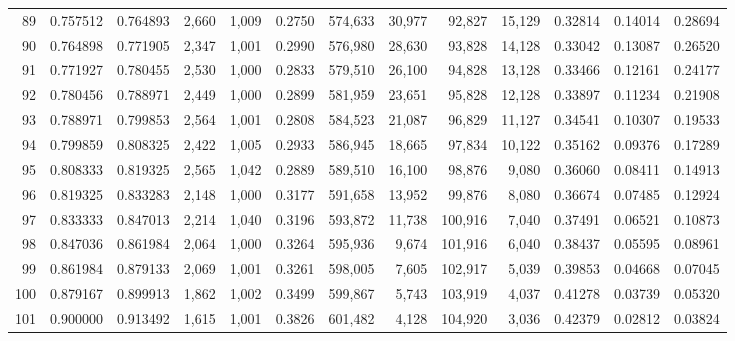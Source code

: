 \begin{tabular}{rrrrrrrrrrrrr}
89  &  0.757512 &  0.764893 &   2,660 &  1,009 &                                     0.2750 &  574,633 &   30,977 &   92,827 &   15,129 &  0.32814 &  0.14014 &  0.28694 \\
90  &  0.764898 &  0.771905 &   2,347 &  1,001 &                                     0.2990 &  576,980 &   28,630 &   93,828 &   14,128 &  0.33042 &  0.13087 &  0.26520 \\
91  &  0.771927 &  0.780455 &   2,530 &  1,000 &                                     0.2833 &  579,510 &   26,100 &   94,828 &   13,128 &  0.33466 &  0.12161 &  0.24177 \\
92  &  0.780456 &  0.788971 &   2,449 &  1,000 &                                     0.2899 &  581,959 &   23,651 &   95,828 &   12,128 &  0.33897 &  0.11234 &  0.21908 \\
93  &  0.788971 &  0.799853 &   2,564 &  1,001 &                                     0.2808 &  584,523 &   21,087 &   96,829 &   11,127 &  0.34541 &  0.10307 &  0.19533 \\
94  &  0.799859 &  0.808325 &   2,422 &  1,005 &                                     0.2933 &  586,945 &   18,665 &   97,834 &   10,122 &  0.35162 &  0.09376 &  0.17289 \\
95  &  0.808333 &  0.819325 &   2,565 &  1,042 &                                     0.2889 &  589,510 &   16,100 &   98,876 &    9,080 &  0.36060 &  0.08411 &  0.14913 \\
96  &  0.819325 &  0.833283 &   2,148 &  1,000 &                                     0.3177 &  591,658 &   13,952 &   99,876 &    8,080 &  0.36674 &  0.07485 &  0.12924 \\
97  &  0.833333 &  0.847013 &   2,214 &  1,040 &                                     0.3196 &  593,872 &   11,738 &  100,916 &    7,040 &  0.37491 &  0.06521 &  0.10873 \\
98  &  0.847036 &  0.861984 &   2,064 &  1,000 &                                     0.3264 &  595,936 &    9,674 &  101,916 &    6,040 &  0.38437 &  0.05595 &  0.08961 \\
99  &  0.861984 &  0.879133 &   2,069 &  1,001 &                                     0.3261 &  598,005 &    7,605 &  102,917 &    5,039 &  0.39853 &  0.04668 &  0.07045 \\
100 &  0.879167 &  0.899913 &   1,862 &  1,002 &                                     0.3499 &  599,867 &    5,743 &  103,919 &    4,037 &  0.41278 &  0.03739 &  0.05320 \\
101 &  0.900000 &  0.913492 &   1,615 &  1,001 &                                     0.3826 &  601,482 &    4,128 &  104,920 &    3,036 &  0.42379 &  0.02812 &  0.03824 \\

\end{tabular}
